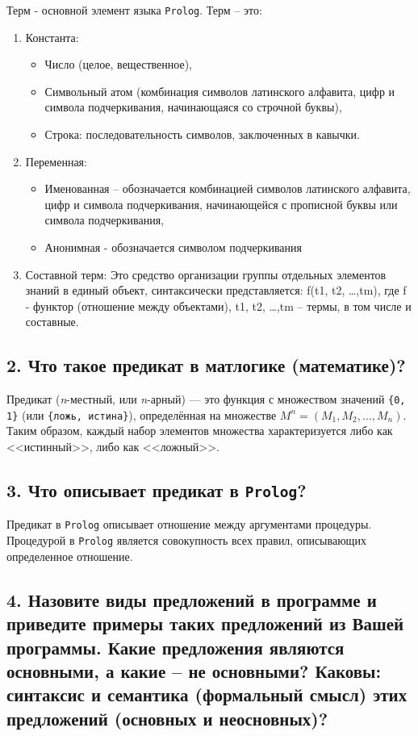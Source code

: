 Терм - основной элемент языка \texttt{Prolog}. Терм – это:
\begin{enumerate}
	\item Константа: 
	\begin{itemize}
		\item Число (целое, вещественное),
		\item Символьный атом (комбинация символов латинского алфавита, цифр и символа подчеркивания, начинающаяся со строчной буквы),
		\item Строка: последовательность символов, заключенных в кавычки.
	\end{itemize}
	\item Переменная:
	\begin{itemize}
		\item Именованная – обозначается комбинацией символов латинского алфавита, цифр и символа подчеркивания, начинающейся с прописной буквы или символа подчеркивания,
		\item Анонимная  - обозначается символом подчеркивания
	\end{itemize}
	\item Составной терм:
	Это средство организации группы отдельных элементов знаний в единый  объект,  синтаксически представляется: f(t1, t2, …,tm), где f -  функтор (отношение между объектами), t1, t2, …,tm – термы, в том  числе  и составные.
\end{enumerate}

\subsection*{2. Что такое предикат в матлогике (математике)?}

Предикат (\textit{n}-местный, или \textit{n}-арный) --- это функция с множеством значений \texttt{\{0, 1\}} (или \texttt{\{ложь, истина\}}), определённая на множестве $M^n = (M_1, M_2, \ldots, M_n)$. Таким образом, каждый набор элементов множества характеризуется либо как <<истинный>>, либо как <<ложный>>.

\subsection*{3. Что описывает предикат в \texttt{Prolog}?}

Предикат в \texttt{Prolog} описывает отношение между аргументами процедуры. Процедурой в \texttt{Prolog} является совокупность всех правил, описывающих определенное отношение.

\subsection*{4. Назовите виды предложений в программе и приведите примеры таких предложений из Вашей программы. Какие предложения являются основными, а какие – не основными?  Каковы: синтаксис и семантика (формальный смысл) этих предложений (основных и неосновных)?}

